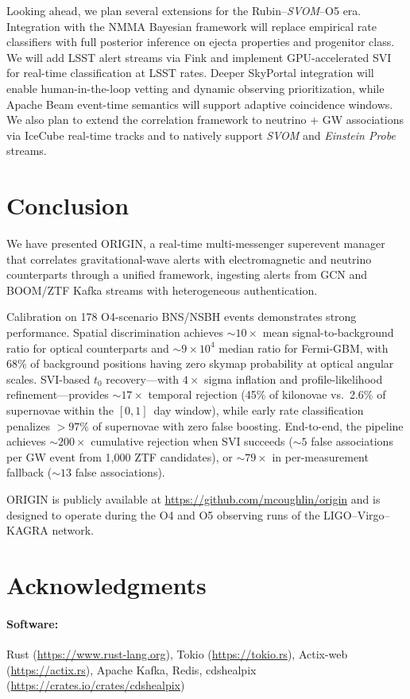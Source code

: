 \documentclass[twocolumn]{article}
\begin{document}
Looking ahead, we plan several extensions for the Rubin--\textit{SVOM}--O5 era. Integration with the NMMA Bayesian framework \citep{Pang2023} will replace empirical rate classifiers with full posterior inference on ejecta properties and progenitor class. We will add LSST alert streams via Fink \citep{Moller2021} and implement GPU-accelerated SVI for real-time classification at LSST rates. Deeper SkyPortal integration \citep{Coughlin2023} will enable human-in-the-loop vetting and dynamic observing prioritization, while Apache Beam event-time semantics will support adaptive coincidence windows. We also plan to extend the correlation framework to neutrino + GW associations via IceCube real-time tracks and to natively support \textit{SVOM} \citep{Wei2016} and \textit{Einstein Probe} \citep{EinsteinProbe2025} streams.

\section{Conclusion} \label{sec:conclusion}

We have presented ORIGIN, a real-time multi-messenger superevent manager that correlates gravitational-wave alerts with electromagnetic and neutrino counterparts through a unified framework, ingesting alerts from GCN and BOOM/ZTF Kafka streams with heterogeneous authentication.

Calibration on 178 O4-scenario BNS/NSBH events demonstrates strong performance. Spatial discrimination achieves ${\sim}10\times$ mean signal-to-background ratio for optical counterparts and ${\sim}9\times10^4$ median ratio for Fermi-GBM, with 68\% of background positions having zero skymap probability at optical angular scales. SVI-based $t_0$ recovery---with $4\times$ sigma inflation and profile-likelihood refinement---provides ${\sim}17\times$ temporal rejection (45\% of kilonovae vs.\ 2.6\% of supernovae within the $[0, 1]$~day window), while early rate classification penalizes $>97\%$ of supernovae with zero false boosting. End-to-end, the pipeline achieves ${\sim}200\times$ cumulative rejection when SVI succeeds (${\sim}5$ false associations per GW event from 1,000 ZTF candidates), or ${\sim}79\times$ in per-measurement fallback (${\sim}13$ false associations).

ORIGIN is publicly available at \url{https://github.com/mcoughlin/origin} and is designed to operate during the O4 and O5 observing runs of the LIGO--Virgo--KAGRA network.

\clearpage

\section*{Acknowledgments}

\paragraph{Software:}
    Rust (\url{https://www.rust-lang.org}),
    Tokio (\url{https://tokio.rs}),
    Actix-web (\url{https://actix.rs}),
    Apache Kafka,
    Redis,
    cdshealpix (\url{https://crates.io/crates/cdshealpix})



\end{document}
